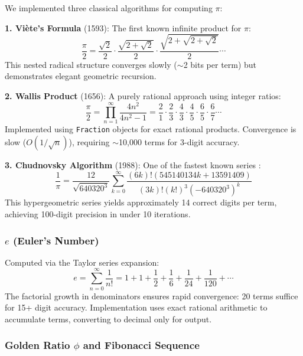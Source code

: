 \documentclass[11pt,a4paper]{article}
\begin{document}
We implemented three classical algorithms for computing $\pi$:

\textbf{1. Viète's Formula} (1593): The first known infinite product for $\pi$:
\begin{equation}
\frac{\pi}{2} = \frac{\sqrt{2}}{2} \cdot \frac{\sqrt{2 + \sqrt{2}}}{2} \cdot \frac{\sqrt{2 + \sqrt{2 + \sqrt{2}}}}{2} \cdots
\end{equation}
This nested radical structure converges slowly ($\sim$2 bits per term) but demonstrates elegant geometric recursion.

\textbf{2. Wallis Product} (1656): A purely rational approach using integer ratios:
\begin{equation}
\frac{\pi}{2} = \prod_{n=1}^{\infty} \frac{4n^2}{4n^2 - 1} = \frac{2}{1} \cdot \frac{2}{3} \cdot \frac{4}{3} \cdot \frac{4}{5} \cdot \frac{6}{5} \cdot \frac{6}{7} \cdots
\end{equation}
Implemented using \texttt{Fraction} objects for exact rational products. Convergence is slow ($O(1/\sqrt{n})$), requiring $\sim$10,000 terms for 3-digit accuracy.

\textbf{3. Chudnovsky Algorithm} (1988): One of the fastest known series \citep{pirecord2025}:
\begin{equation}
\frac{1}{\pi} = \frac{12}{\sqrt{640320^3}} \sum_{k=0}^{\infty} \frac{(6k)! (545140134k + 13591409)}{(3k)!(k!)^3 (-640320^3)^k}
\end{equation}
This hypergeometric series yields approximately 14 correct digits per term, achieving 100-digit precision in under 10 iterations.

\subsubsection{$e$ (Euler's Number)}

Computed via the Taylor series expansion:
\begin{equation}
e = \sum_{n=0}^{\infty} \frac{1}{n!} = 1 + 1 + \frac{1}{2} + \frac{1}{6} + \frac{1}{24} + \frac{1}{120} + \cdots
\end{equation}
The factorial growth in denominators ensures rapid convergence: 20 terms suffice for 15+ digit accuracy. Implementation uses exact rational arithmetic to accumulate terms, converting to decimal only for output.

\subsubsection{Golden Ratio $\phi$ and Fibonacci Sequence}
\end{document}
